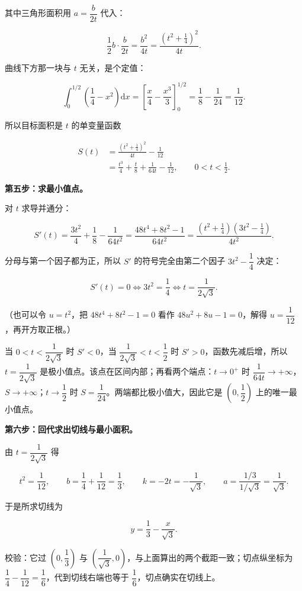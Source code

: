 \documentclass[UTF8,11pt,fontset=windows]{ctexart}
\begin{document}
其中三角形面积用 $a=\dfrac{b}{2t}$ 代入：

$$
\frac12 b\cdot\frac b{2t}=\frac{b^2}{4t}=\frac{\left(t^2+\frac14\right)^2}{4t}.
$$

曲线下方那一块与 $t$ 无关，是个定值：

$$
\int_0^{1/2}\left(\frac14-x^2\right)\mathrm dx
=\left[\frac x4-\frac{x^3}{3}\right]_0^{1/2}
=\frac18-\frac1{24}=\frac1{12}.
$$

所以目标面积是 $t$ 的单变量函数

$$
\begin{aligned}
S(t)&=\frac{\left(t^2+\frac14\right)^2}{4t}-\frac1{12}\\
&=\frac{t^3}{4}+\frac t8+\frac1{64t}-\frac1{12},
\qquad 0<t<\frac12.
\end{aligned}
$$

\textbf{第五步：求最小值点。}

对 $t$ 求导并通分：

$$
S'(t)=\frac{3t^2}{4}+\frac18-\frac1{64t^2}
=\frac{48t^4+8t^2-1}{64t^2}
=\frac{\left(t^2+\frac14\right)\left(3t^2-\frac14\right)}{4t^2}.
$$

分母与第一个因子都为正，所以 $S'$ 的符号完全由第二个因子 $3t^2-\dfrac14$ 决定：

$$
S'(t)=0\iff 3t^2=\frac14\iff t=\frac{1}{2\sqrt3}.
$$

（也可以令 $u=t^2$，把 $48t^4+8t^2-1=0$ 看作 $48u^2+8u-1=0$，解得 $u=\dfrac1{12}$，再开方取正根。）

当 $0<t<\dfrac{1}{2\sqrt3}$ 时 $S'<0$，当 $\dfrac{1}{2\sqrt3}<t<\dfrac12$ 时 $S'>0$，函数先减后增，所以 $t=\dfrac{1}{2\sqrt3}$ 是极小值点。该点在区间内部；再看两个端点：$t\to0^+$ 时 $\dfrac1{64t}\to+\infty$，$S\to+\infty$；$t\to\dfrac12$ 时 $S=\dfrac1{24}$。两端都比极小值大，因此它是 $(0,\dfrac12)$ 上的唯一最小值点。

\textbf{第六步：回代求出切线与最小面积。}

由 $t=\dfrac{1}{2\sqrt3}$ 得

$$
t^2=\frac1{12},\qquad
b=\frac14+\frac1{12}=\frac13,\qquad
k=-2t=-\frac{1}{\sqrt3},\qquad
a=\frac{1/3}{1/\sqrt3}=\frac1{\sqrt3}.
$$

于是所求切线为

$$
\boxed{y=\frac13-\frac{x}{\sqrt3}}.
$$

校验：它过 $\left(0,\dfrac13\right)$ 与 $\left(\dfrac1{\sqrt3},0\right)$，与上面算出的两个截距一致；切点纵坐标为 $\dfrac14-\dfrac1{12}=\dfrac16$，代到切线右端也等于 $\dfrac16$，切点确实在切线上。
\end{document}
